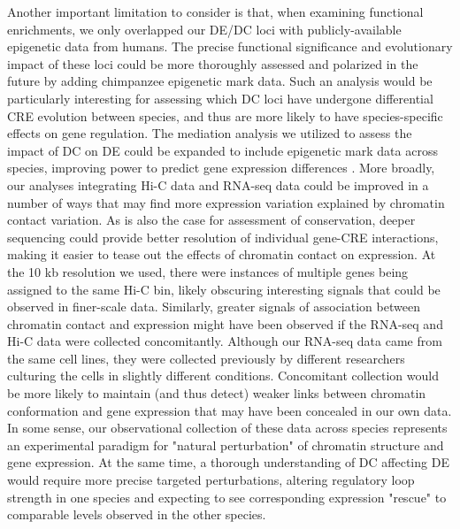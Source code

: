 Another important limitation to consider is that, when examining functional enrichments, we only overlapped our DE/DC loci with publicly-available epigenetic data from humans. The precise functional significance and evolutionary impact of these loci could be more thoroughly assessed and polarized in the future by adding chimpanzee epigenetic mark data. Such an analysis would be particularly interesting for assessing which DC loci have undergone differential CRE evolution between species, and thus are more likely to have species-specific effects on gene regulation. The mediation analysis we utilized to assess the impact of DC on DE could be expanded to include epigenetic mark data across species, improving power to predict gene expression differences \cite{Karlić.2010}. More broadly, our analyses integrating Hi-C data and RNA-seq data could be improved in a number of ways that may find more expression variation explained by chromatin contact variation. As is also the case for assessment of conservation, deeper sequencing could provide better resolution of individual gene-CRE interactions, making it easier to tease out the effects of chromatin contact on expression. At the 10 kb resolution we used, there were instances of multiple genes being assigned to the same Hi-C bin, likely obscuring interesting signals that could be observed in finer-scale data. Similarly, greater signals of association between chromatin contact and expression might have been observed if the RNA-seq and Hi-C data were collected concomitantly. Although our RNA-seq data came from the same cell lines, they were collected previously by different researchers culturing the cells in slightly different conditions. Concomitant collection would be more likely to maintain (and thus detect) weaker links between chromatin conformation and gene expression that may have been concealed in our own data. In some sense, our observational collection of these data across species represents an experimental paradigm for "natural perturbation" of chromatin structure and gene expression. At the same time, a thorough understanding of DC affecting DE would require more precise targeted perturbations, altering regulatory loop strength in one species and expecting to see corresponding expression "rescue" to comparable levels observed in the other species.

